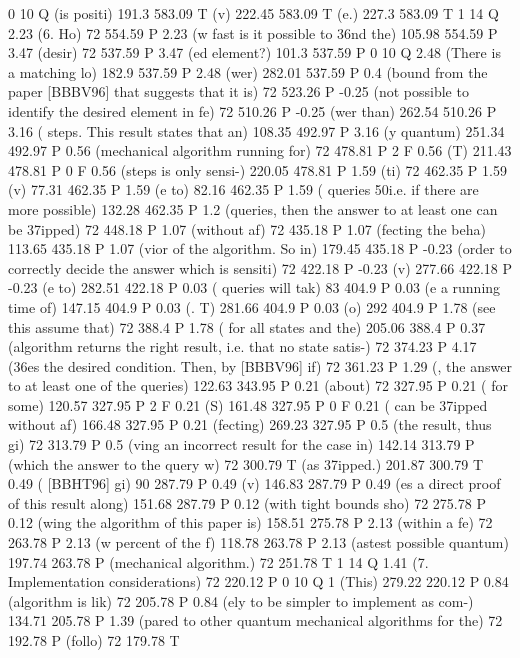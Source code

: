 0 10 Q
(is positi) 191.3 583.09 T
(v) 222.45 583.09 T
(e.) 227.3 583.09 T
1 14 Q
2.23 (6. Ho) 72 554.59 P
2.23 (w fast is it possible to \336nd the) 105.98 554.59 P
3.47 (desir) 72 537.59 P
3.47 (ed element?) 101.3 537.59 P
0 10 Q
2.48 (There is a matching lo) 182.9 537.59 P
2.48 (wer) 282.01 537.59 P
0.4 (bound from the paper [BBBV96] that suggests that it is) 72 523.26 P
-0.25 (not possible to identify the desired element in fe) 72 510.26 P
-0.25 (wer than) 262.54 510.26 P
3.16 ( steps. This result states that an) 108.35 492.97 P
3.16 (y quantum) 251.34 492.97 P
0.56 (mechanical algorithm running for) 72 478.81 P
2 F
0.56 (T) 211.43 478.81 P
0 F
0.56 (steps is only sensi-) 220.05 478.81 P
1.59 (ti) 72 462.35 P
1.59 (v) 77.31 462.35 P
1.59 (e to) 82.16 462.35 P
1.59 ( queries \050i.e. if there are more possible) 132.28 462.35 P
1.2 (queries, then the answer to at least one can be \337ipped) 72 448.18 P
1.07 (without af) 72 435.18 P
1.07 (fecting the beha) 113.65 435.18 P
1.07 (vior of the algorithm. So in) 179.45 435.18 P
-0.23 (order to correctly decide the answer which is sensiti) 72 422.18 P
-0.23 (v) 277.66 422.18 P
-0.23 (e to) 282.51 422.18 P
0.03 ( queries will tak) 83 404.9 P
0.03 (e a running time of) 147.15 404.9 P
0.03 (. T) 281.66 404.9 P
0.03 (o) 292 404.9 P
1.78 (see this assume that) 72 388.4 P
1.78 ( for all states and the) 205.06 388.4 P
0.37 (algorithm returns the right result, i.e. that no state satis-) 72 374.23 P
4.17 (\336es the desired condition. Then, by [BBBV96] if) 72 361.23 P
1.29 (, the answer to at least one of the queries) 122.63 343.95 P
0.21 (about) 72 327.95 P
0.21 ( for some) 120.57 327.95 P
2 F
0.21 (S) 161.48 327.95 P
0 F
0.21 ( can be \337ipped without af) 166.48 327.95 P
0.21 (fecting) 269.23 327.95 P
0.5 (the result, thus gi) 72 313.79 P
0.5 (ving an incorrect result for the case in) 142.14 313.79 P
(which the answer to the query w) 72 300.79 T
(as \337ipped.) 201.87 300.79 T
0.49 ( [BBHT96] gi) 90 287.79 P
0.49 (v) 146.83 287.79 P
0.49 (es a direct proof of this result along) 151.68 287.79 P
0.12 (with tight bounds sho) 72 275.78 P
0.12 (wing the algorithm of this paper is) 158.51 275.78 P
2.13 (within a fe) 72 263.78 P
2.13 (w percent of the f) 118.78 263.78 P
2.13 (astest possible quantum) 197.74 263.78 P
(mechanical algorithm.) 72 251.78 T
1 14 Q
1.41 (7. Implementation considerations) 72 220.12 P
0 10 Q
1 (This) 279.22 220.12 P
0.84 (algorithm is lik) 72 205.78 P
0.84 (ely to be simpler to implement as com-) 134.71 205.78 P
1.39 (pared to other quantum mechanical algorithms for the) 72 192.78 P
(follo) 72 179.78 T
